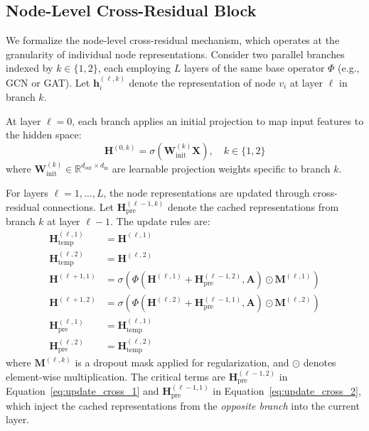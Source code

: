 \subsection{Node-Level Cross-Residual Block}

We formalize the node-level cross-residual mechanism, which operates at the granularity of individual node representations. Consider two parallel branches indexed by $k \in \{1, 2\}$, each employing $L$ layers of the same base operator $\Phi$ (e.g., GCN or GAT). Let $\mathbf{h}_i^{(\ell, k)}$ denote the representation of node $v_i$ at layer $\ell$ in branch $k$.

At layer $\ell=0$, each branch applies an initial projection to map input features to the hidden space:
\begin{equation}
\mathbf{H}^{(0, k)} = \sigma\left(\mathbf{W}_{\text{init}}^{(k)} \mathbf{X}\right), \quad k \in \{1, 2\}
\end{equation}
where $\mathbf{W}_{\text{init}}^{(k)} \in \mathbb{R}^{d_{\text{out}} \times d_{\text{in}}}$ are learnable projection weights specific to branch $k$.

For layers $\ell = 1, \ldots, L$, the node representations are updated through cross-residual connections. Let $\mathbf{H}_{\text{pre}}^{(\ell-1, k)}$ denote the cached representations from branch $k$ at layer $\ell-1$. The update rules are:
\begin{align}
\mathbf{H}_{\text{temp}}^{(\ell, 1)} &= \mathbf{H}^{(\ell, 1)} \label{eq:cache_1} \\
\mathbf{H}_{\text{temp}}^{(\ell, 2)} &= \mathbf{H}^{(\ell, 2)} \label{eq:cache_2} \\
\mathbf{H}^{(\ell+1, 1)} &= \sigma\left(\Phi\left(\mathbf{H}^{(\ell, 1)} + \mathbf{H}_{\text{pre}}^{(\ell-1, 2)}, \mathbf{A}\right) \odot \mathbf{M}^{(\ell, 1)}\right) \label{eq:update_cross_1} \\
\mathbf{H}^{(\ell+1, 2)} &= \sigma\left(\Phi\left(\mathbf{H}^{(\ell, 2)} + \mathbf{H}_{\text{pre}}^{(\ell-1, 1)}, \mathbf{A}\right) \odot \mathbf{M}^{(\ell, 2)}\right) \label{eq:update_cross_2} \\
\mathbf{H}_{\text{pre}}^{(\ell, 1)} &= \mathbf{H}_{\text{temp}}^{(\ell, 1)} \label{eq:update_pre_1} \\
\mathbf{H}_{\text{pre}}^{(\ell, 2)} &= \mathbf{H}_{\text{temp}}^{(\ell, 2)} \label{eq:update_pre_2}
\end{align}
where $\mathbf{M}^{(\ell, k)}$ is a dropout mask applied for regularization, and $\odot$ denotes element-wise multiplication. The critical terms are $\mathbf{H}_{\text{pre}}^{(\ell-1, 2)}$ in Equation~\ref{eq:update_cross_1} and $\mathbf{H}_{\text{pre}}^{(\ell-1, 1)}$ in Equation~\ref{eq:update_cross_2}, which inject the cached representations from the \textit{opposite branch} into the current layer.

